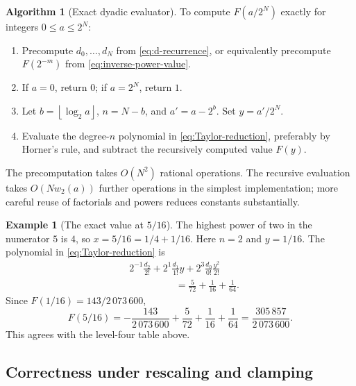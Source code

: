 \documentclass[11pt,oneside]{article}
\theoremstyle{definition}
\newtheorem{example}[theorem]{Example}
\newtheorem{algorithm}[theorem]{Algorithm}
\theoremstyle{remark}
\newcommand{\wt}{w_2}
\newcommand{\floor}[1]{\left\lfloor#1\right\rfloor}
\begin{document}
\begin{algorithm}[Exact dyadic evaluator]\label{alg:dyadic-evaluator}
To compute $F(a/2^N)$ exactly for integers $0\le a\le2^N$:
\begin{enumerate}
\item Precompute $d_0,\ldots,d_N$ from \eqref{eq:d-recurrence}, or equivalently
      precompute $F(2^{-m})$ from \eqref{eq:inverse-power-value}.
\item If $a=0$, return $0$; if $a=2^N$, return $1$.
\item Let $b=\floor{\log_2 a}$, $n=N-b$, and $a'=a-2^b$.
      Set $y=a'/2^N$.
\item Evaluate the degree-$n$ polynomial in \eqref{eq:Taylor-reduction}, preferably
      by Horner's rule, and subtract the recursively computed value $F(y)$.
\end{enumerate}
The precomputation takes $O(N^2)$ rational operations.  The recursive evaluation
takes $O(N\wt(a))$ further operations in the simplest implementation; more careful
reuse of factorials and powers reduces constants substantially.
\end{algorithm}

\begin{example}[The exact value at $5/16$]\label{ex:F-five-sixteen}
The highest power of two in the numerator $5$ is $4$, so
$x=5/16=1/4+1/16$.  Here $n=2$ and $y=1/16$.  The polynomial in
\eqref{eq:Taylor-reduction} is
\begin{align*}
 &2^{-1}\frac{d_2}{2!}
 +2^1\frac{d_1}{1!}y
 +2^3\frac{d_0}{0!}\frac{y^2}{2!}\\
 &\hspace{2cm}=\frac5{72}+\frac1{16}+\frac1{64}.
\end{align*}
Since $F(1/16)=143/2\,073\,600$,
\begin{equation}\label{eq:F-five-sixteen}
 F(5/16)
 =-\frac{143}{2\,073\,600}
  +\frac5{72}+\frac1{16}+\frac1{64}
 =\frac{305\,857}{2\,073\,600}.
\end{equation}
This agrees with the level-four table above.
\end{example}

\subsection{Correctness under rescaling and clamping}
\end{document}

